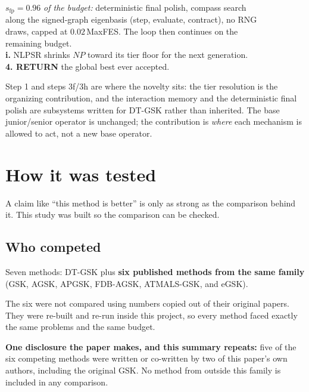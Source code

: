 \documentclass[11pt,a4paper]{article}
\newcommand{\hl}[1]{\textbf{#1}}
\begin{document}
\begin{tcolorbox}[breakable, colback=boxgrey, colframe=black!45, boxrule=0.4pt,
  arc=2pt, left=3.5mm, right=2.5mm, top=2mm, bottom=2mm]
{\hspace*{9mm}$s_{\mathrm{fp}}=0.96$ \emph{of the budget:} deterministic final polish, compass
search\\
\hspace*{9mm}along the signed-graph eigenbasis (step, evaluate, contract), no RNG\\
\hspace*{9mm}draws, capped at $0.02\,$MaxFES. The loop then continues on the\\
\hspace*{9mm}remaining budget.\\
\hspace*{4mm}\textbf{i.} NLPSR shrinks $NP$ toward its tier floor for the next generation.\\[3pt]

\textbf{4. RETURN} the global best ever accepted.
}
\end{tcolorbox}

Step 1 and steps 3f/3h are where the novelty sits: the tier resolution is the
organizing contribution, and the interaction memory and the deterministic final polish
are subsystems written for DT-GSK rather than inherited. The base
junior/senior operator is unchanged; the contribution is \emph{where} each
mechanism is allowed to act, not a new base operator.

\section{How it was tested}

A claim like ``this method is better'' is only as strong as the comparison
behind it. This study was built so the comparison can be checked.

\subsection{Who competed}

Seven methods: DT-GSK plus \hl{six published methods from the same family}
(GSK, AGSK, APGSK, FDB-AGSK, ATMALS-GSK, and eGSK).

The six were not compared using numbers copied out of their original papers.
They were re-built and re-run inside this project, so every method faced exactly
the same problems and the same budget.

\hl{One disclosure the paper makes, and this summary repeats:} five of the six
competing methods were written or co-written by two of this paper's own authors,
including the original GSK. No method from outside this family is included in any
comparison.
\end{document}
